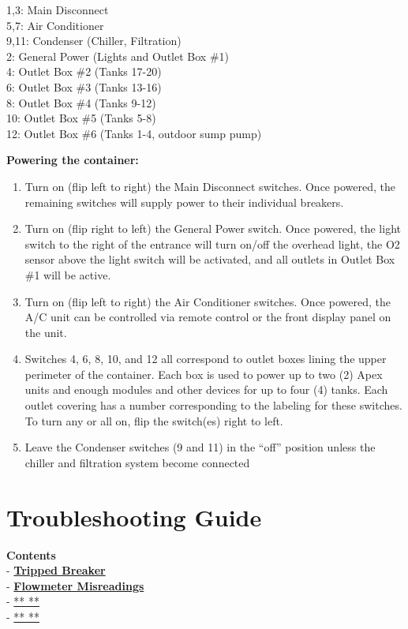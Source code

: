 \documentclass[]{book}
\providecommand{\tightlist}{%
  \setlength{\itemsep}{0pt}\setlength{\parskip}{0pt}}
\begin{document}
1,3: Main Disconnect\\
5,7: Air Conditioner\\
9,11: Condenser (Chiller, Filtration)\\
2: General Power (Lights and Outlet Box \#1)\\
4: Outlet Box \#2 (Tanks 17-20)\\
6: Outlet Box \#3 (Tanks 13-16)\\
8: Outlet Box \#4 (Tanks 9-12)\\
10: Outlet Box \#5 (Tanks 5-8)\\
12: Outlet Box \#6 (Tanks 1-4, outdoor sump pump)

\textbf{Powering the container:}

\begin{enumerate}
\def\labelenumi{\arabic{enumi}.}
\tightlist
\item
  Turn on (flip left to right) the Main Disconnect switches. Once
  powered, the remaining switches will supply power to their individual
  breakers.
\item
  Turn on (flip right to left) the General Power switch. Once powered,
  the light switch to the right of the entrance will turn on/off the
  overhead light, the O2 sensor above the light switch will be
  activated, and all outlets in Outlet Box \#1 will be active.
\item
  Turn on (flip left to right) the Air Conditioner switches. Once
  powered, the A/C unit can be controlled via remote control or the
  front display panel on the unit.
\item
  Switches 4, 6, 8, 10, and 12 all correspond to outlet boxes lining the
  upper perimeter of the container. Each box is used to power up to two
  (2) Apex units and enough modules and other devices for up to four (4)
  tanks. Each outlet covering has a number corresponding to the labeling
  for these switches. To turn any or all on, flip the switch(es) right
  to left.
\item
  Leave the Condenser switches (9 and 11) in the ``off'' position unless
  the chiller and filtration system become connected
\end{enumerate}

\chapter{Troubleshooting Guide}\label{troubleshooting-guide}

\textbf{Contents}\\
- \protect\hyperlink{Tripped_Breaker}{\textbf{Tripped Breaker}}\\
- \protect\hyperlink{Flowmeter_Misreadings}{\textbf{Flowmeter
Misreadings}}\\
- \protect\hyperlink{}{** **}\\
- \protect\hyperlink{}{** **}
\end{document}
